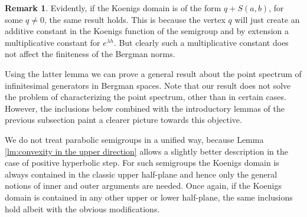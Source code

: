 \documentclass[11pt]{amsart}
\numberwithin{equation}{section}
\theoremstyle{definition}
\newtheorem{remark}[theorem]{Remark}
\begin{document}
	\begin{remark}
		Evidently, if the Koenigs domain is of the form $q+S(a,b)$, for some $q\ne0$, the same result holds. This is because the vertex $q$ will just create an additive constant in the Koenigs function of the semigroup and by extension a multiplicative constant for $e^{\lambda h}$. But clearly such a multiplicative constant does not affect the finiteness of the Bergman norms.
	\end{remark}
	
	Using the latter lemma we can prove a general result about the point spectrum of infinitesimal generators in Bergman spaces. Note that our result does not solve the problem of characterizing the point spectrum, other than in certain cases. However, the inclusions below combined with the introductory lemmas of the previous subsection paint a clearer picture towards this objective. 
	
	We do not treat parabolic semigroups in a unified way, because Lemma \ref{lm:convexity in the upper direction} allows a slightly better description in the case of positive hyperbolic step. 
	For such semigroups the Koenigs domain is always contained in the classic upper half-plane and hence only the general notions of inner and outer arguments are needed. Once again, if the Koenigs domain is contained in any other upper or lower half-plane, the same inclusions hold albeit with the obvious modifications.
	
	
	
\end{document}

